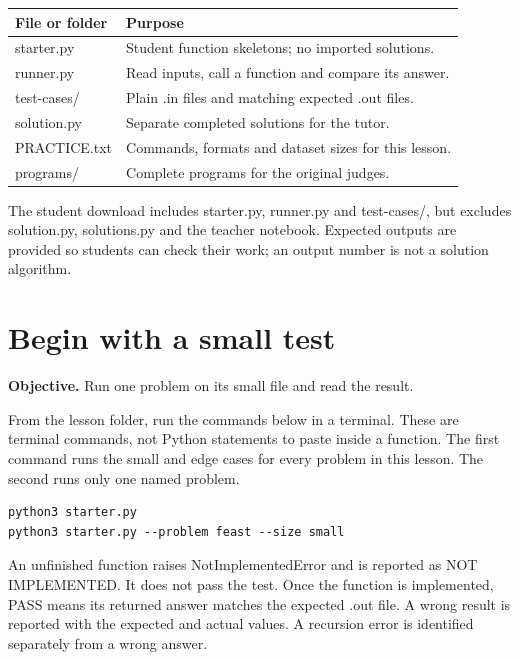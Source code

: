 \documentclass[11pt,a4paper,oneside]{report}
\newcommand{\sectiongoal}[1]{\par{\color{quiet}\textbf{Objective.} #1}\par\smallskip}
\newcommand{\nextpointer}[1]{\par\smallskip{\color{quiet}\textbf{Next.} #1}\par}
\begin{document}
\par\medskip\begingroup\small\setlength{\tabcolsep}{4pt}\renewcommand{\arraystretch}{1.3}\begin{tabularx}{\linewidth}{>{\raggedright\arraybackslash}p{30mm}>{\raggedright\arraybackslash}X}\toprule\textbf{File or folder} & \textbf{Purpose}\\\midrule
{}starter.py & Student function skeletons; no imported solutions.\\
{}runner.py & Read inputs, call a function and compare its answer.\\
{}test-cases/ & Plain .in files and matching expected .out files.\\
{}solution.py & Separate completed solutions for the tutor.\\
{}PRACTICE.txt & Commands, formats and dataset sizes for this lesson.\\
{}programs/ & Complete programs for the original judges.\\
\bottomrule\end{tabularx}\endgroup\par\medskip
The student download includes starter.py, runner.py and test-cases/, but excludes solution.py, solutions.py and the teacher notebook. Expected outputs are provided so students can check their work; an output number is not a solution algorithm.

\nextpointer{Run the small tests first.}
\section{Begin with a small test}
\sectiongoal{Run one problem on its small file and read the result.}
From the lesson folder, run the commands below in a terminal. These are terminal commands, not Python statements to paste inside a function. The first command runs the small and edge cases for every problem in this lesson. The second runs only one named problem.

\begin{lstlisting}[language={}]
python3 starter.py
python3 starter.py --problem feast --size small
\end{lstlisting}
An unfinished function raises NotImplementedError and is reported as NOT IMPLEMENTED. It does not pass the test. Once the function is implemented, PASS means its returned answer matches the expected .out file. A wrong result is reported with the expected and actual values. A recursion error is identified separately from a wrong answer.
\end{document}
